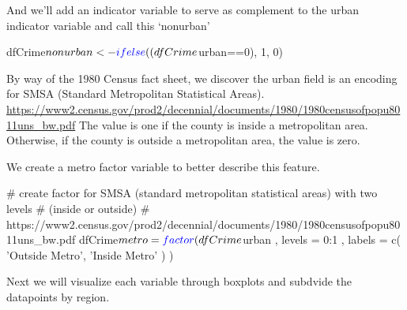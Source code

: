 \documentclass[]{article}
\newenvironment{Shaded}{}{}
\newcommand{\CommentTok}[1]{\textcolor[rgb]{0.00,0.50,0.00}{#1}}
\newcommand{\DataTypeTok}[1]{#1}
\newcommand{\DecValTok}[1]{#1}
\newcommand{\KeywordTok}[1]{\textcolor[rgb]{0.00,0.00,1.00}{#1}}
\newcommand{\NormalTok}[1]{#1}
\newcommand{\OperatorTok}[1]{#1}
\newcommand{\StringTok}[1]{\textcolor[rgb]{0.00,0.50,0.50}{#1}}
\begin{document}
And we'll add an indicator variable to serve as complement to the urban
indicator variable and call this `nonurban'

\begin{Shaded}
\begin{Highlighting}[]
\NormalTok{dfCrime}\OperatorTok{$}\NormalTok{nonurban <-}\StringTok{ }\KeywordTok{ifelse}\NormalTok{((dfCrime}\OperatorTok{$}\NormalTok{urban}\OperatorTok{==}\DecValTok{0}\NormalTok{), }\DecValTok{1}\NormalTok{, }\DecValTok{0}\NormalTok{)}
\end{Highlighting}
\end{Shaded}

By way of the 1980 Census fact sheet, we discover the urban field is an
encoding for SMSA (Standard Metropolitan Statistical Areas).
\url{https://www2.census.gov/prod2/decennial/documents/1980/1980censusofpopu8011uns_bw.pdf}
The value is one if the county is inside a metropolitan area. Otherwise,
if the county is outside a metropolitan area, the value is zero.

We create a metro factor variable to better describe this feature.

\begin{Shaded}
\begin{Highlighting}[]
\CommentTok{# create factor for SMSA (standard metropolitan statistical areas) with two levels}
\CommentTok{# (inside or outside)}
\CommentTok{#    https://www2.census.gov/prod2/decennial/documents/1980/1980censusofpopu8011uns_bw.pdf}
\NormalTok{dfCrime}\OperatorTok{$}\NormalTok{metro =}
\StringTok{            }\KeywordTok{factor}\NormalTok{( dfCrime}\OperatorTok{$}\NormalTok{urban , }\DataTypeTok{levels =} \DecValTok{0}\OperatorTok{:}\DecValTok{1}\NormalTok{ , }\DataTypeTok{labels =}
                    \KeywordTok{c}\NormalTok{( }\StringTok{'Outside Metro'}\NormalTok{,}
                       \StringTok{'Inside Metro'}
\NormalTok{                      )}
\NormalTok{                   )}
\end{Highlighting}
\end{Shaded}

Next we will visualize each variable through boxplots and subdvide the
datapoints by region.
\end{document}
